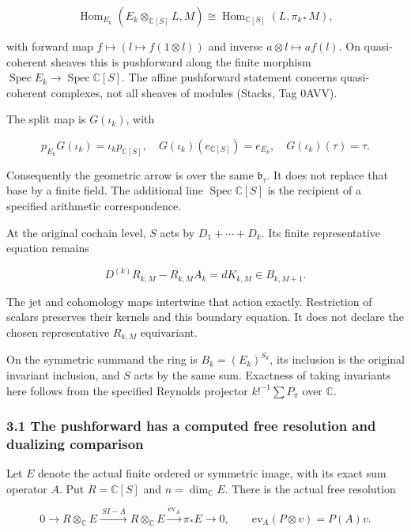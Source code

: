 \documentclass[
]{article}
\begin{document}
\[\operatorname{Hom}_{E_k}(E_k\otimes_{\mathbb C[S]}L,M)
\cong\operatorname{Hom}_{\mathbb C[S]}(L,\pi_{k*}M),\tag{3.2}\]

with forward map \(f\mapsto(l\mapsto f(1\otimes l))\) and inverse
\(a\otimes l\mapsto a f(l)\). On quasi-coherent sheaves this is
pushforward along the finite morphism
\(\operatorname{Spec}E_k\to\operatorname{Spec}\mathbb C[S]\). The affine
pushforward statement concerns quasi-coherent complexes, not all sheaves
of modules (Stacks, Tag 0AVV).

The split map is \(G(\iota_k)\), with

\[p_{E_k}G(\iota_k)=\iota_kp_{\mathbb C[S]},\quad
G(\iota_k)(e_{\mathbb C[S]})=e_{E_k},\quad G(\iota_k)(\tau)=\tau.\tag{3.3}\]

Consequently the geometric arrow is over the same \(\mathfrak b_\tau\).
It does not replace that base by a finite field. The additional line
\(\operatorname{Spec}\mathbb C[S]\) is the recipient of a specified
arithmetic correspondence.

At the original cochain level, \(S\) acts by \(D_1+\cdots+D_k\). Its
finite representative equation remains

\[D^{(k)}R_{k,M}-R_{k,M}A_k=dK_{k,M}\in B_{k,M+1}.\tag{3.4}\]

The jet and cohomology maps intertwine that action exactly. Restriction
of scalars preserves their kernels and this boundary equation. It does
not declare the chosen representative \(R_{k,M}\) equivariant.

On the symmetric summand the ring is \(B_k=(E_k)^{S_k}\), its inclusion
is the original invariant inclusion, and \(S\) acts by the same sum.
Exactness of taking invariants here follows from the specified Reynolds
projector \(k!^{-1}\sum P_\pi\) over \(\mathbb C\).

\subsubsection{3.1 The pushforward has a computed free resolution and
dualizing
comparison}\label{the-pushforward-has-a-computed-free-resolution-and-dualizing-comparison}

Let \(E\) denote the actual finite ordered or symmetric image, with its
exact sum operator \(A\). Put \(R=\mathbb C[S]\) and
\(n=\dim_\mathbb C E\). There is the actual free resolution

\[\boxed{0\longrightarrow R\otimes_\mathbb C E
\xrightarrow{\ S I-A\ }R\otimes_\mathbb C E
\xrightarrow{\mathrm{ev}_A}\pi_*E\longrightarrow0,\qquad
\mathrm{ev}_A(P\otimes v)=P(A)v.}\tag{3.5}\]
\end{document}
